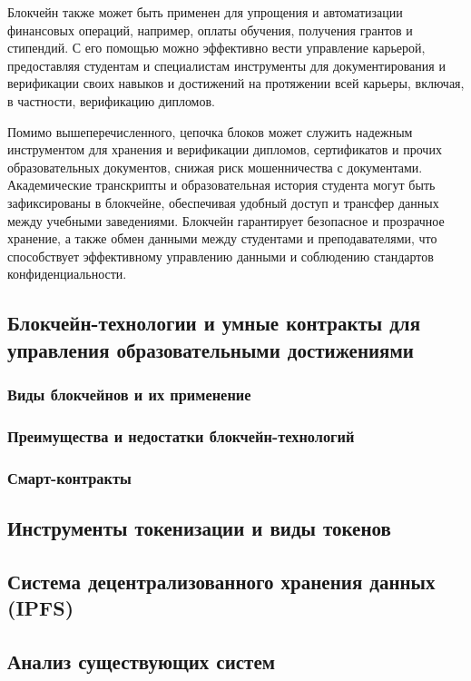 Блокчейн также может быть применен для упрощения и автоматизации финансовых операций, например, оплаты обучения, получения грантов и стипендий. С его помощью можно эффективно вести управление карьерой, предоставляя студентам и специалистам инструменты для документирования и верификации своих навыков и достижений на протяжении всей карьеры, включая, в частности, верификацию дипломов.

Помимо вышеперечисленного, цепочка блоков может служить надежным инструментом для хранения и верификации дипломов, сертификатов и прочих образовательных документов, снижая риск мошенничества с документами. Академические транскрипты и образовательная история студента могут быть зафиксированы в блокчейне, обеспечивая удобный доступ и трансфер данных между учебными заведениями. Блокчейн гарантирует безопасное и прозрачное хранение, а также обмен данными между студентами и преподавателями, что способствует эффективному управлению данными и соблюдению стандартов конфиденциальности.

\subsection{Блокчейн-технологии и умные контракты для управления образовательными достижениями}

\subsubsection{Виды блокчейнов и их применение}

\subsubsection{Преимущества и недостатки блокчейн-технологий}

\subsubsection{Смарт-контракты}

\subsection{Инструменты токенизации и виды токенов}

\subsection{Система децентрализованного хранения данных (IPFS)}

\subsection{Анализ существующих систем}